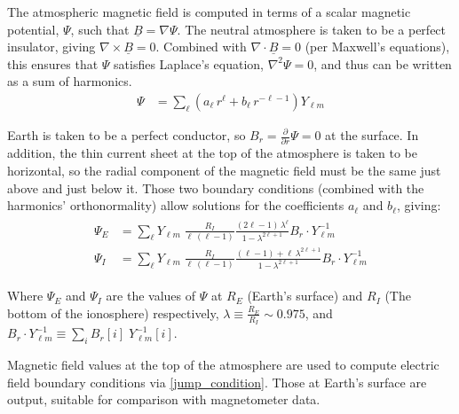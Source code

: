 \documentclass{article}
\renewcommand{\vec}[1]{\ensuremath{\underline{#1}}}
\newcommand{\dd}[1]{\ensuremath{ \frac{\partial}{\partial #1} }\xspace}
\newcommand{\curl}[1]{\ensuremath{ \nabla \times \vec{#1} }\xspace}
\renewcommand{\div}[1]{\ensuremath{ \nabla \cdot \vec{#1} }\xspace}
\newcommand{\grad}[1]{\ensuremath{ \nabla #1 }\xspace}
\newcommand{\lr}[1]{ \left( #1 \right) }
\newcommand{\azm}{\ensuremath{m}\xspace}
\begin{document}
The atmospheric magnetic field is computed in terms of a scalar magnetic potential, $\Psi$, such that $\vec{B}=\grad{\Psi}$. The neutral atmosphere is taken to be a perfect insulator, giving $\curl{B}=0$. Combined with $\div{B}=0$ (per Maxwell's equations), this ensures that $\Psi$ satisfies Laplace's equation, $\nabla^2 \Psi = 0$, and thus can be written as a sum of harmonics\cite{jackson_1999}.
\begin{align}
  \label{psi_expansion}
  \Psi &= \displaystyle\sum_\ell \lr{ a_\ell \, r^\ell +
    b_\ell \, r^{-\ell - 1} } Y_{\ell\azm}
\end{align}

Earth is taken to be a perfect conductor, so $B_r = \dd{r} \Psi = 0$ at the surface. In addition, the thin current sheet at the top of the atmosphere is taken to be horizontal, so the radial component of the magnetic field must be the same just above and just below it. Those two boundary conditions (combined with the harmonics' orthonormality) allow solutions for the coefficients $a_\ell$ and $b_\ell$, giving:
\begin{align}
  \label{psi_final}
  \begin{split}
  \Psi_E &= \displaystyle\sum_\ell Y_{\ell\azm} \; \frac{R_I}{ \ell \, \lr{\ell - 1} } \frac{ \lr{2 \ell - 1} \, \lambda^\ell }{ 1 - \lambda^{2 \ell + 1} } B_r \cdot Y_{\ell\azm}^{-1} \\
  \Psi_I &= \displaystyle\sum_\ell Y_{\ell\azm} \; \frac{R_I}{ \ell \, \lr{\ell - 1} } \frac{ \lr{\ell - 1} + \ell \, \lambda^{2 \ell + 1} }{ 1 - \lambda^{2 \ell + 1} } B_r \cdot Y_{\ell\azm}^{-1}
  \end{split}
\end{align}

Where $\Psi_E$ and $\Psi_I$ are the values of $\Psi$ at $R_E$ (Earth's surface) and $R_I$ (The bottom of the ionosphere) respectively, $\lambda \equiv \frac{R_E}{R_I} \sim \num{0.975}$, and $B_r \cdot Y_{\ell\azm}^{-1} \equiv \displaystyle\sum_i B_r [i] \; Y_{\ell\azm}^{-1} \! [i]$.

Magnetic field values at the top of the atmosphere are used to compute electric field boundary conditions via \cref{jump_condition}. Those at Earth's surface are output, suitable for comparison with magnetometer data.

\end{document}
